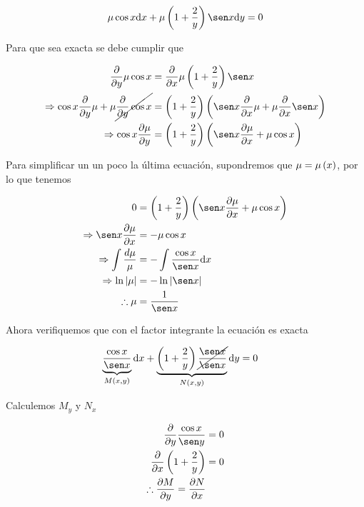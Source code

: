  \begin{align*}
     \mu \cos x \dd x + \mu \pr{1+\dfrac{2}{y}}\sen x \dd y = 0
 \end{align*}
 
 Para que sea exacta se debe cumplir que
 
 \begin{align*}
     \dfrac{\partial}{\partial y} \mu \cos x &= \dfrac{\partial}{\partial x} \mu \pr{1+\dfrac{2}{y}}\sen x \\ 
     \Rightarrow \cos x \dfrac{\partial}{\partial y} \mu + \mu \cc{\dfrac{\partial }{\partial y} \cos x} &= \pr{1+\dfrac{2}{y}}\pr{\sen x \dfrac{\partial}{\partial x}\mu + \mu \dfrac{\partial}{\partial x}\sen x} \\
     \Rightarrow \cos x \dfrac{\partial \mu}{\partial y} &= \pr{1+\dfrac{2}{y}}\pr{\sen x\dfrac{\partial \mu}{\partial x}+\mu \cos x}
 \end{align*}
 
 Para simplificar un un poco la última ecuación, supondremos que $\mu=\mu\left( x \right)$, por lo que tenemos
 
 \begin{align*}
     0&=\pr{1+\dfrac{2}{y}}\pr{\sen x \dfrac{\partial \mu}{\partial x}+\mu\cos x} \\ 
     \Rightarrow \sen x \dfrac{\partial \mu}{\partial x} &= -\mu \cos x \\
     \Rightarrow \int \dfrac{d\mu}{\mu} &= -\int\dfrac{\cos x}{\sen x} \dd x \\ 
     \Rightarrow \ln \nr{\mu} &= -\ln\nr{\sen x} \\ 
     \therefore \mu &= \dfrac{1}{\sen x}
 \end{align*}
 
 Ahora verifiquemos que con el factor integrante la ecuación es exacta
 
 \begin{align}
     \underbrace{\dfrac{\cos x}{\sen x}}_{M\pr{x,y}}\dd x + \underbrace{\pr{1+\dfrac{2}{y}}\cc{\dfrac{\sen x}{\sen x}}}_{N\pr{x,y}}\dd y &= 0
 \end{align}
 
 Calculemos $M_y$ y $N_x$
 
 \begin{align}
     \dfrac{\partial }{\partial y} \dfrac{\cos x}{\sen y} &= 0\\
     \dfrac{\partial}{\partial x} \pr{1+\dfrac{2}{y}}&= 0 \\
     \therefore \dfrac{\partial M}{\partial y} = \dfrac{\partial N}{\partial x}
 \end{align}
 
